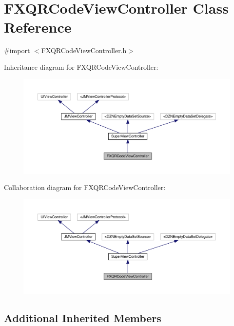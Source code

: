 \hypertarget{interface_f_x_q_r_code_view_controller}{}\section{F\+X\+Q\+R\+Code\+View\+Controller Class Reference}
\label{interface_f_x_q_r_code_view_controller}


{\ttfamily \#import $<$F\+X\+Q\+R\+Code\+View\+Controller.\+h$>$}



Inheritance diagram for F\+X\+Q\+R\+Code\+View\+Controller\+:\nopagebreak
\begin{figure}[H]
\begin{center}
\leavevmode
\includegraphics[width=350pt]{interface_f_x_q_r_code_view_controller__inherit__graph}
\end{center}
\end{figure}


Collaboration diagram for F\+X\+Q\+R\+Code\+View\+Controller\+:\nopagebreak
\begin{figure}[H]
\begin{center}
\leavevmode
\includegraphics[width=350pt]{interface_f_x_q_r_code_view_controller__coll__graph}
\end{center}
\end{figure}
\subsection*{Additional Inherited Members}


